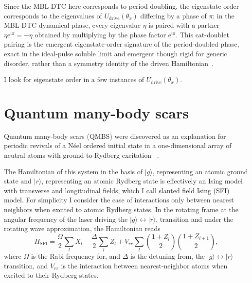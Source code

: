 \documentclass[longbibliography]{revtex4-2}
\newcommand{\im}[0]{\mathfrak{i}}
\begin{document}
Since the MBL-DTC here corresponds to period doubling, the eigenstate
order corresponds to the eigenvalues of $U_{\mathrm{drive}}(\theta_x)$
differing by a phase of $\pi$: in the MBL-DTC dynamical phase, every
eigenvalue $\eta$ is paired with a partner
$\eta \mathrm{e}^{\im\pi} = -\eta$ obtained by multiplying by the
phase factor $\mathrm{e}^{\im\pi}$. This cat-doublet pairing is the
emergent eigenstate-order signature of the period-doubled phase, exact
in the ideal-pulse soluble limit and emergent though rigid for generic
disorder, rather than a symmetry identity of the driven
Hamiltonian~\cite{khemani2016phase, else2016floquet, yao2017discrete}.

I look for eigenstate order in a few instances of
$U_{\mathrm{drive}}(\theta_x)$.



\section{Quantum many-body scars}\label{quantum-many-body-scars}

Quantum many-body scars (QMBS) were discovered as an explanation for
periodic revivals of a N\'eel ordered initial state in a one-dimensional
array of neutral atoms with ground-to-Rydberg excitation
~\cite{bernien2017probing, bluvstein2021controlling}.

The Hamiltonian of this system in the basis of $| g \rangle$,
representing an atomic ground state and $| r \rangle$, representing an
atomic Rydberg state is effectively an Ising model with transverse and
longitudinal fields, which I call slanted field Ising
(SFI) model. For simplicity I consider the case of interactions only
between nearest neighbors when excited to atomic Rydberg states. In
the rotating frame at the angular frequency of the laser driving the
$| g \rangle \leftrightarrow | r \rangle$, transition and under the
rotating wave approximation, the Hamiltonian reads
\begin{equation}\label{eq:sfi-notes}
    H_{\mathrm{SFI}}
    =
    \frac{\Omega}{2} \sum_{l} X_{l} -
    \frac{\Delta}{2} \sum_{l} Z_{l} +
    V_{rr} \sum_{l} \left( \frac{1 + Z_{l}}{2} \right)
                    \left( \frac{1 + Z_{l+1}}{2} \right),
\end{equation}
where $\Omega$ is the Rabi frequency for, and $\Delta$ is the detuning
from, the $| g \rangle \leftrightarrow | r \rangle$ transition, and
$V_{rr}$ is the interaction between nearest-neighbor atoms when
excited to their Rydberg states.
\end{document}
